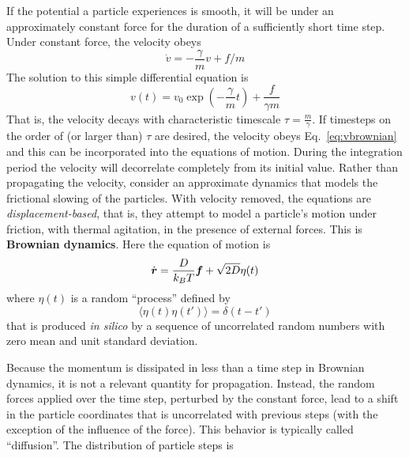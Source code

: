 If the potential a particle experiences is smooth, it will be under an approximately constant force for the duration of a sufficiently short time step.
Under constant force, the velocity obeys
\begin{equation}
\dot{v} = -\frac{\gamma}{m} v + f/m
\end{equation}
The solution to this simple differential equation is
\begin{equation}
v(t) = v_0 \exp(-\frac{\gamma}{m} t) + \frac{f}{\gamma m}
\label{eq:vbrownian}
\end{equation}
That is, the velocity decays with characteristic timescale $\tau=\frac{m}{\gamma}$.
If timesteps on the order of (or larger than) $\tau$ are desired, the velocity obeys Eq.~\ref{eq:vbrownian} and this can be incorporated into the equations of motion.
During the integration period the velocity will decorrelate completely from its initial value.
Rather than propagating the velocity, consider an approximate dynamics that models the frictional slowing of the particles. 
With velocity removed, the equations are {\it displacement-based}, that is, they attempt to model a particle's motion under friction, with thermal agitation, in the presence of external forces.
This is {\bf Brownian dynamics}. 
Here the equation of motion is 
\begin{equation}
\dot{\boldsymbol{r}} = \frac{D}{k_B T} \boldsymbol{f} + \sqrt{2 D} \eta(t)
\end{equation}
where $\eta(t)$ is a random ``process'' defined by
\begin{equation}
\langle \eta(t) \eta(t')\rangle = \delta(t-t')
\end{equation} 
that is produced {\it in silico} by a sequence of uncorrelated random numbers with zero mean and unit standard deviation.

Because the momentum is dissipated in less than a time step in Brownian dynamics, it is not a relevant quantity for propagation.
Instead, the random forces applied over the time step, perturbed by the constant force, lead to a shift in the particle coordinates that is uncorrelated with previous steps (with the exception of the influence of the force).
This behavior is typically called ``diffusion''.
The distribution of particle steps is 

